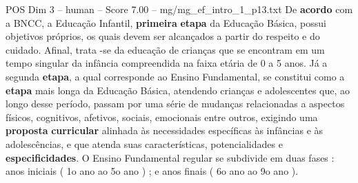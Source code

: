 \begin{textsample}{POS Dim 3 – human – Score 7.00 – mg/mg\_ef\_intro\_1\_p13.txt}  \label{ex:f3_pos_006}
De \textbf{acordo} com a BNCC, a Educação Infantil, \textbf{primeira} \textbf{etapa} da Educação Básica, possui objetivos próprios, os quais devem ser alcançados a partir do respeito e do cuidado.
Afinal, trata -se da educação de crianças que se encontram em um tempo singular da infância compreendida na faixa etária de 0 a 5 anos.
Já a segunda \textbf{etapa}, a qual corresponde ao Ensino Fundamental, se constitui como a \textbf{etapa} mais longa da Educação Básica, atendendo crianças e adolescentes que, ao longo desse período, passam por uma série de mudanças relacionadas a aspectos físicos, cognitivos, afetivos, sociais, emocionais entre outros, exigindo uma \textbf{proposta} \textbf{curricular} alinhada às necessidades específicas às infâncias e às adolescências, e que atenda suas características, potencialidades e \textbf{especificidades}.
O Ensino Fundamental regular se subdivide em duas fases : anos iniciais ( 1o ano ao 5o ano ) ; e anos finais ( 6o ano ao 9o ano ).

\end{textsample}
